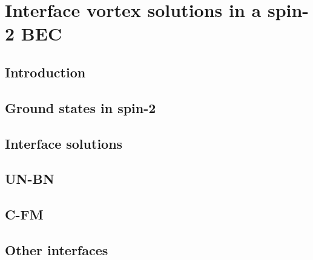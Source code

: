 \chapter{Interface vortex solutions in a spin-2 BEC}

\section{Introduction}

\section{Ground states in spin-2}

\section{Interface solutions}

\section{UN-BN}

\section{C-FM}

\section{Other interfaces}
